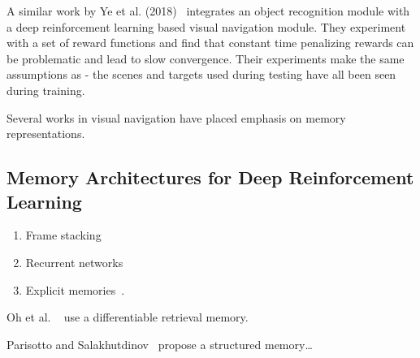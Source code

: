 A similar work by Ye et al. (2018)~\cite{ye_active_2018} integrates an object recognition module with a deep reinforcement learning based visual navigation module.
They experiment with a set of reward functions and find that constant time penalizing rewards can be problematic and lead to slow convergence.
Their experiments make the same assumptions as \cite{zhu_target_driven} - the scenes and targets used during testing have all been seen during training.

Several works in visual navigation have placed emphasis on memory representations.~\cite{savinov_topmem_2018,oh_minecraft_2016,parisotto_salakhutdinov_2017,chen_memory_2017} %

\subsection{Memory Architectures for Deep Reinforcement Learning}

\begin{enumerate}
    \item Frame stacking
    \item Recurrent networks
    \item Explicit memories~\cite{oh_minecraft_2016,parisotto_salakhutdinov_2017}.
\end{enumerate}


Oh et al. ~\cite{oh_minecraft_2016} use a differentiable retrieval memory.

Parisotto and Salakhutdinov~\cite{parisotto_salakhutdinov_2017} propose a structured memory\dots %



